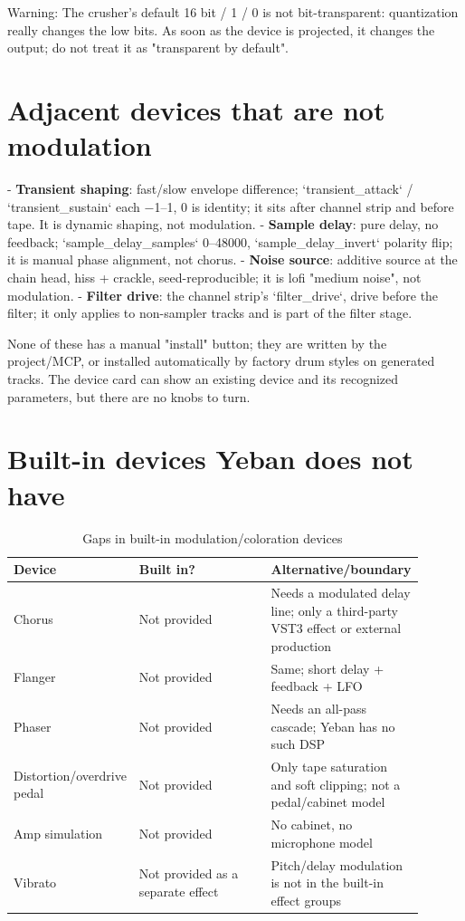 Warning: The crusher's default 16 bit / 1 / 0 is not bit-transparent: quantization really changes the low bits. As soon as the device is projected, it changes the output; do not treat it as "transparent by default".

\section{Adjacent devices that are not modulation}

- \textbf{Transient shaping}: fast/slow envelope difference; `transient_attack` / `transient_sustain` each −1–1, 0 is identity; it sits after channel strip and before tape. It is dynamic shaping, not modulation.
- \textbf{Sample delay}: pure delay, no feedback; `sample_delay_samples` 0–48000, `sample_delay_invert` polarity flip; it is manual phase alignment, not chorus.
- \textbf{Noise source}: additive source at the chain head, hiss + crackle, seed-reproducible; it is lofi "medium noise", not modulation.
- \textbf{Filter drive}: the channel strip's `filter_drive`, drive before the filter; it only applies to non-sampler tracks and is part of the filter stage.

None of these has a manual "install" button; they are written by the project/MCP, or installed automatically by factory drum styles on generated tracks. The device card can show an existing device and its recognized parameters, but there are no knobs to turn.

\section{Built-in devices Yeban does not have}

\begin{table}[htbp]
\centering
\small
\begin{tabular}{@{}p{0.22\linewidth}p{0.34\linewidth}p{0.34\linewidth}@{}}
\hline
Device & Built in? & Alternative/boundary \\
\hline
Chorus & Not provided & Needs a modulated delay line; only a third-party VST3 effect or external production \\
Flanger & Not provided & Same; short delay + feedback + LFO \\
Phaser & Not provided & Needs an all-pass cascade; Yeban has no such DSP \\
Distortion/overdrive pedal & Not provided & Only tape saturation and soft clipping; not a pedal/cabinet model \\
Amp simulation & Not provided & No cabinet, no microphone model \\
Vibrato & Not provided as a separate effect & Pitch/delay modulation is not in the built-in effect groups \\
\hline
\end{tabular}
\caption{Gaps in built-in modulation/coloration devices}
\label{tab:modulation-gaps}
\end{table}

